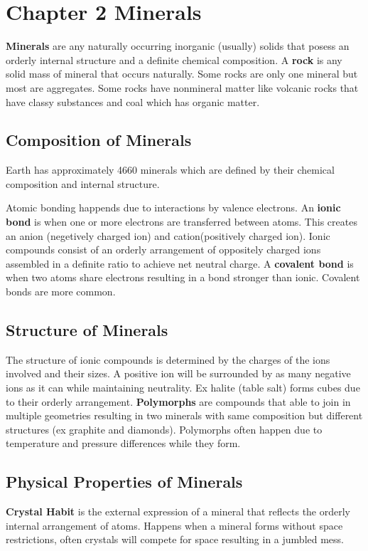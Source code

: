 \documentclass{article}
\begin{document}
\section*{Chapter 2 Minerals} %
\label{sec:chapter_2}
\textbf{Minerals} are any naturally occurring inorganic (usually) solids that posess an orderly internal structure and a definite chemical composition. A \textbf{rock} is any solid mass of mineral that occurs naturally. Some rocks are only one mineral but most are aggregates. Some rocks have nonmineral matter like volcanic rocks that have classy substances and coal which has organic matter.

\subsection*{Composition of Minerals} %
\label{sub:composition_of_minerals}
Earth has approximately 4660 minerals which are defined by their chemical composition and internal structure.

Atomic bonding happends due to interactions by valence electrons. An \textbf{ionic bond} is when one or more electrons are transferred between atoms. This creates an anion (negetively charged ion) and cation(positively charged ion). Ionic compounds consist of an orderly arrangement of oppositely charged ions assembled in a definite ratio to achieve net neutral charge. A \textbf{covalent bond} is when two atoms share electrons resulting in a bond stronger than ionic. Covalent bonds are more common.

\subsection*{Structure of Minerals} %
\label{sub:structure_of_minerals}
The structure of ionic compounds is determined by the charges of the ions involved and their sizes. A positive ion will be surrounded by as many negative ions as it can while maintaining neutrality. Ex halite (table salt) forms cubes due to their orderly arrangement. \textbf{Polymorphs} are compounds that able to join in multiple geometries resulting in two minerals with same composition but different structures (ex graphite and diamonds). Polymorphs often happen due to temperature and pressure differences while they form.

\subsection*{Physical Properties of Minerals} %
\label{sub:physical_properties_of_minerals}
\textbf{Crystal Habit} is the external expression of a mineral that reflects the orderly internal arrangement of atoms. Happens when a mineral forms without space restrictions, often crystals will compete for space resulting in a jumbled mess.
\end{document}
